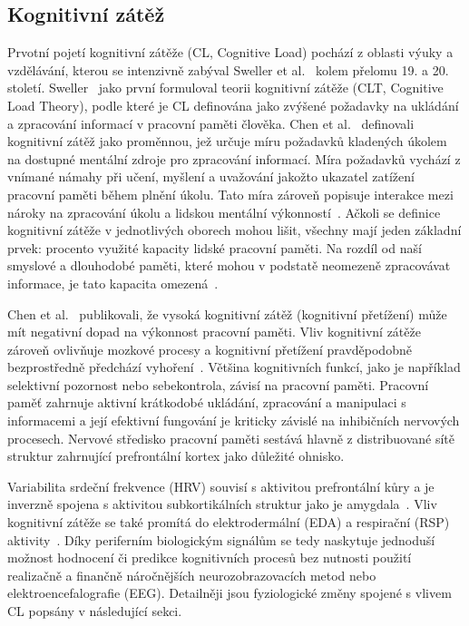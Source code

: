 \subsection{Kognitivní zátěž}
\label{subsection:kognitivni_zatez}
Prvotní pojetí kognitivní zátěže (\gls{CL}, Cognitive Load) pochází z oblasti
výuky a vzdělávání, kterou se intenzivně zabýval Sweller et
al.~\cite{Sweller1988,Sweller1998,Sweller2010} kolem přelomu 19. a 20. století.
Sweller~\cite{Sweller1988} jako první formuloval teorii kognitivní zátěže
(\gls{CLT}, Cognitive Load Theory), podle které je \gls{CL} definována jako
zvýšené požadavky na ukládání a zpracování informací v pracovní paměti člověka.
Chen et al.~\cite{Chen2016} definovali kognitivní zátěž jako proměnnou, jež
určuje míru požadavků kladených úkolem na dostupné mentální zdroje pro
zpracování informací. Míra požadavků vychází z vnímané námahy při učení, myšlení
a uvažování jakožto ukazatel zatížení pracovní paměti během plnění úkolu. Tato
míra zároveň popisuje interakce mezi nároky na zpracování úkolu a lidskou
mentální výkonností~\cite{Haapalainen2010}. Ačkoli se definice kognitivní zátěže
v jednotlivých oborech mohou lišit, všechny mají jeden základní prvek: procento
využité kapacity lidské pracovní paměti. Na rozdíl od naší smyslové a dlouhodobé
paměti, které mohou v podstatě neomezeně zpracovávat informace, je tato kapacita
omezená~\cite{Vanneste2021}.

Chen et al.~\cite{Chen2016} publikovali, že vysoká kognitivní zátěž (kognitivní
přetížení) může mít negativní dopad na výkonnost pracovní paměti. Vliv
kognitivní zátěže zároveň ovlivňuje mozkové procesy a kognitivní přetížení
pravděpodobně bezprostředně předchází vyhoření~\cite{Vanneste2021}. Většina
kognitivních funkcí, jako je například selektivní pozornost nebo sebekontrola,
závisí na pracovní paměti. Pracovní paměť zahrnuje aktivní krátkodobé ukládání,
zpracování a manipulaci s informacemi a její efektivní fungování je kriticky
závislé na inhibičních nervových procesech. Nervové středisko pracovní paměti
sestává hlavně z distribuované sítě struktur zahrnující prefrontální kortex jako
důležité ohnisko. 

Variabilita srdeční frekvence (\gls{HRV}) souvisí s aktivitou prefrontální kůry
a je inverzně spojena s aktivitou subkortikálních struktur jako je
amygdala~\cite{Thayer2009}. Vliv kognitivní zátěže se také promítá do
elektrodermální (\gls{EDA}) a respirační (\gls{RSP})
aktivity~\cite{Mogilever2018}. Díky periferním biologickým signálům se tedy
naskytuje jednoduší možnost hodnocení či predikce kognitivních procesů bez
nutnosti použití realizačně a finančně náročnějších neurozobrazovacích metod
nebo elektroencefalografie (\gls{EEG}). Detailněji jsou fyziologické změny
spojené s vlivem \gls{CL} popsány v následující sekci.

